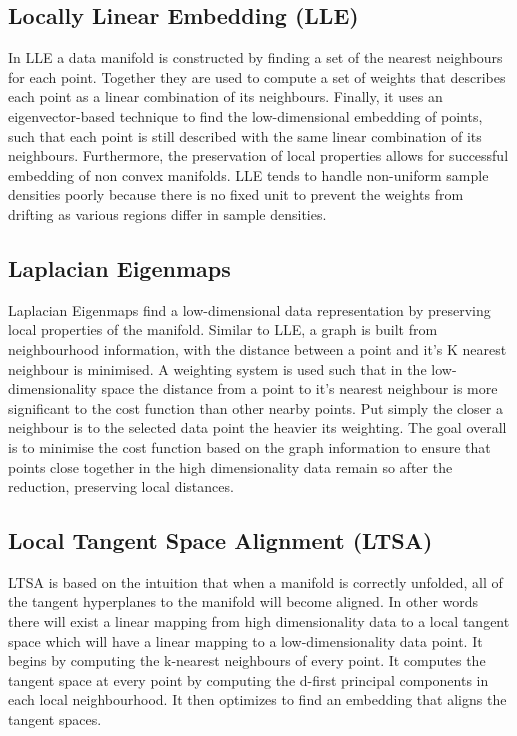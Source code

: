 \subsection{Locally Linear Embedding (LLE)}
In LLE a data manifold is constructed by finding a set of the nearest neighbours for each point\cite{Roweis2000}. Together they are used to compute a set of weights that describes each point as a linear combination of its neighbours. Finally, it uses an eigenvector-based technique to find the low-dimensional embedding of points, such that each point is still described with the same linear combination of its neighbours. Furthermore, the preservation of local properties allows for successful embedding of non convex manifolds.
LLE tends to handle non-uniform sample densities poorly because there is no fixed unit to prevent the weights from drifting as various regions differ in sample densities.

\subsection{Laplacian Eigenmaps}
Laplacian Eigenmaps find a low-dimensional data representation by preserving local properties of the manifold.\cite{Belkin2003} Similar to LLE, a graph is built from neighbourhood information, with the distance between a point and it's K nearest neighbour is minimised. A weighting system is used such that in the low-dimensionality space the distance from a point to it's nearest neighbour is more significant to the cost function than other nearby points. Put simply the closer a neighbour is to the selected data point the heavier its weighting. The goal overall is to minimise the cost function based on the graph information to ensure that points close together in the high dimensionality data remain so after the reduction, preserving local distances. 


\subsection{Local Tangent Space Alignment (LTSA)}
LTSA is based on the intuition that when a manifold is correctly unfolded, all of the tangent hyperplanes to the manifold will become aligned.\cite{Zhang2003} In other words there will exist a linear mapping from high dimensionality data to a local tangent space which will have a linear mapping to a low-dimensionality data point. It begins by computing the k-nearest neighbours of every point. It computes the tangent space at every point by computing the d-first principal components in each local neighbourhood. It then optimizes to find an embedding that aligns the tangent spaces.


